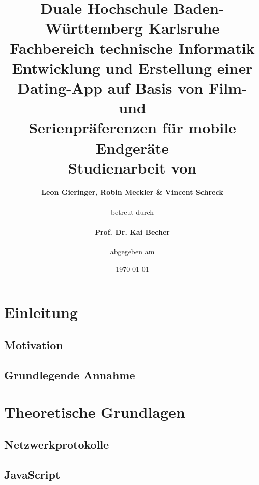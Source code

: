 \documentclass[11pt,a4paper]{article}
\title{\normalsize{Duale Hochschule Baden-Württemberg Karlsruhe}\\
		Fachbereich technische Informatik\\ \vspace{2cm}
		\huge{\textbf{Entwicklung und Erstellung einer }}\\
		\textbf{Dating-App auf Basis von Film- und }\\
		\textbf{Serienpräferenzen für mobile Endgeräte}\\ \vspace{2cm}
		\normalsize{Studienarbeit} von\\
		}
\author{\textbf{Leon Gieringer, Robin Meckler \& Vincent Schreck} \\ \vspace{2cm} \\
		betreut durch \\ \\
		\textbf{Prof. Dr. Kai Becher} \\ \vspace{2cm} \\
		abgegeben am
		}
\date{\today}
\begin{document}
\maketitle
\thispagestyle{empty}
\newpage

\newpage
{}
\tableofcontents
\newpage
\listoffigures
\newpage
\listoftables
\newpage
\lstlistoflistings
\newpage
{}



\pagestyle{fancy}
\fancyhf{}
\setlength{\headheight}{35pt}

\renewcommand\headrulewidth{0.4pt}

\fancyhead[LE,RO]{\rightmark}%
\renewcommand{\sectionmark}[1]{\markright{#1}}
\renewcommand{\subsectionmark}[1]{\markright{#1}}
\renewcommand{\subsubsectionmark}[1]{\markright{#1}}

\cfoot{\thepage}


\clearpage
\section{Einleitung}
\label{sec:einleitung}

\subsection{Motivation}

\subsection{Grundlegende Annahme}


\clearpage
\section{Theoretische Grundlagen}
\subsection{Netzwerkprotokolle}


\clearpage
\subsection{JavaScript}

\end{document}
